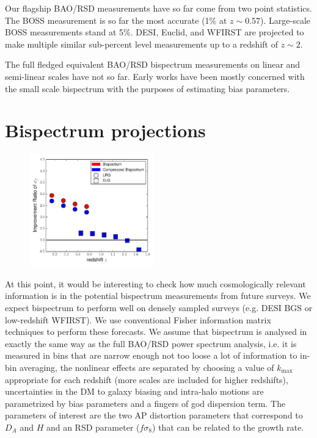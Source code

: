 Our flagship BAO/RSD measurements have so far come from two point statistics.
The BOSS measurement is so far the most accurate (1\% at $z\sim0.57$).
Large-scale BOSS measurements stand at 5\%.  DESI, Euclid, and WFIRST are
projected to make multiple similar sub-percent level measurements up to a
redshift of $z\sim 2$.

The full fledged equivalent BAO/RSD bispectrum measurements on linear and
semi-linear scales have not so far. Early works have been mostly concerned with
the small scale bispectrum with the purposes of estimating bias parameters.

\section{Bispectrum projections}

\begin{figure}
\begin{center}
\includegraphics[width=0.48\textwidth]{fz.pdf}
\end{center}
\end{figure}


At this point, it would be interesting to check how much cosmologically
relevant information is in the potential bispectrum measurements from future
surveys. We expect bispectrum to perform well on densely sampled surveys (e.g.
DESI BGS or low-redshift WFIRST). We use conventional Fisher information matrix
techniques to perform these forecasts. We assume that bispectrum is analysed in
exactly the same way as the full BAO/RSD power spectrum analysis, i.e. it is
measured in bins that are narrow enough not too loose a lot of information to
in-bin averaging, the nonlinear effects are separated by choosing a value of
$k_\mathrm{max}$ appropriate for each redshift (more scales are included for
higher redshifts), uncertainties in the DM to galaxy biasing and intra-halo
motions are parametrized by bias parameters and a fingers of god dispersion
term. The parameters of interest are the two AP distortion parameters that
correspond to $D_A$ and $H$ and an RSD parameter ($f\sigma_8$) that can be
related to the growth rate.


